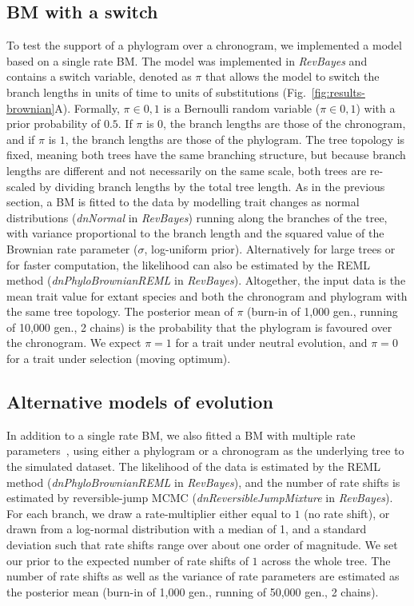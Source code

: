 \documentclass{article}
\newcommand{\PhyloSupport}{\pi}
\begin{document}
\subsection*{BM with a switch}
To test the support of a phylogram over a chronogram, we implemented a model based on a single rate BM.
The model was implemented in \textit{RevBayes} and contains a switch variable, denoted as $\PhyloSupport$ that allows the model to switch the branch lengths in units of time to units of substitutions (Fig.~\ref{fig:results-brownian}A).
Formally, $\PhyloSupport \in {0, 1}$ is a Bernoulli random variable ($\PhyloSupport \in {0, 1}$) with a prior probability of $0.5$.
If $\PhyloSupport$ is $0$, the branch lengths are those of the chronogram, and if $\PhyloSupport$ is $1$, the branch lengths are those of the phylogram.
The tree topology is fixed, meaning both trees have the same branching structure, but because branch lengths are different and not necessarily on the same scale, both trees are re-scaled by dividing branch lengths by the total tree length.
As in the previous section, a BM is fitted to the data by modelling trait changes as normal distributions (\textit{dnNormal} in \textit{RevBayes}) running along the branches of the tree, with variance proportional to the branch length and the squared value of the Brownian rate parameter ($\sigma$, log-uniform prior).
Alternatively for large trees or for faster computation, the likelihood can also be estimated by the REML method (\textit{dnPhyloBrownianREML} in \textit{RevBayes}).
Altogether, the input data is the mean trait value for extant species and both the chronogram and phylogram with the same tree topology.
The posterior mean of $\PhyloSupport$ (burn-in of 1,000 gen., running of 10,000 gen., 2 chains) is the probability that the phylogram is favoured over the chronogram.
We expect $\PhyloSupport = 1$ for a trait under neutral evolution, and $\PhyloSupport = 0$ for a trait under selection (moving optimum).

\subsection*{Alternative models of evolution}
In addition to a single rate BM, we also fitted a BM with multiple rate parameters~\citep{eastman_novel_2011}, using either a phylogram or a chronogram as the underlying tree to the simulated dataset.
The likelihood of the data is estimated by the REML method (\textit{dnPhyloBrownianREML} in \textit{RevBayes}), and the number of rate shifts is estimated by reversible-jump MCMC (\textit{dnReversibleJumpMixture} in \textit{RevBayes}).
For each branch, we draw a rate-multiplier either equal to $1$ (no rate shift), or drawn from a log-normal distribution with a median of 1, and a standard deviation such that rate shifts range over about one order of magnitude.
We set our prior to the expected number of rate shifts of $1$ across the whole tree.
The number of rate shifts as well as the variance of rate parameters are estimated as the posterior mean (burn-in of 1,000 gen., running of 50,000 gen., 2 chains).
\end{document}
